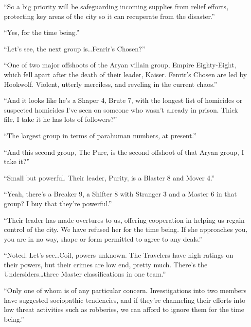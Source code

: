 ``So a big priority will be safeguarding incoming supplies from relief efforts, protecting key areas of the city so it can recuperate from the disaster.''



``Yes, for the time being.''



``Let's see, the next group is\ldots Fenrir's Chosen?''



``One of two major offshoots of the Aryan villain group, Empire Eighty-Eight, which fell apart after the death of their leader, Kaiser.  Fenrir's Chosen are led by Hookwolf.  Violent, utterly merciless, and reveling in the current chaos.''



``And it looks like he's a Shaper 4, Brute 7, with the longest list of homicides or suspected homicides I've seen on someone who wasn't already in prison.  Thick file, I take it he has lots of followers?''



``The largest group in terms of parahuman numbers, at present.''



``And this second group, The Pure, is the second offshoot of that Aryan group, I take it?''



``Small but powerful.  Their leader, Purity, is a Blaster 8 and Mover 4.''



``Yeah, there's a Breaker 9, a Shifter 8 with Stranger 3 and a Master 6 in that group?  I buy that they're powerful.''



``Their leader has made overtures to us, offering cooperation in helping us regain control of the city.  We have refused her for the time being.  If she approaches you, you are in no way, shape or form permitted to agree to any deals.''



``Noted.  Let's see\ldots  Coil, powers unknown.  The Travelers have high ratings on their powers, but their crimes are low end, pretty much.  There's the Undersiders\ldots three Master classifications in one team.''



``Only one of whom is of any particular concern.  Investigations into two members have suggested sociopathic tendencies, and if they're channeling their efforts into low threat activities such as robberies, we can afford to ignore them for the time being.''



